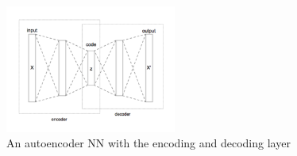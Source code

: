 \begin{figure}[H]
\begin{center}
  \includegraphics[width=0.5\textwidth]{./img/autoencoder_structure}
  \caption{An autoencoder NN with the encoding and decoding layer}
  \label{fig:autoencoder}
\end{center}
\end{figure}


